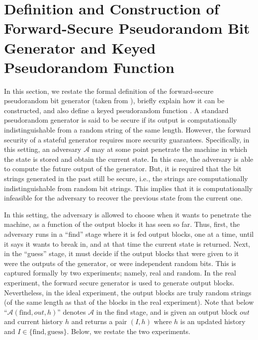 

\section{Definition and Construction of Forward-Secure Pseudorandom Bit Generator and Keyed Pseudorandom Function}\label{app:def-FS-PRG}

In this section, we restate the formal definition of the forward-secure pseudorandom bit generator (taken from \cite{BellareY03}), briefly explain how it can be constructed, and also define a keyed pseudorandom function \prf. A standard pseudorandom generator is said to be secure if its output is computationally indistinguishable from a random string of the same length. However, the forward security of a stateful generator requires more security guarantees. Specifically, in this setting,  an adversary $\mathcal{A}$ may at some point penetrate the machine in which the state is stored and obtain the current state. In this case, the adversary is able to compute the future output of the generator. But, it is required that the bit strings generated in the past still be secure, i.e., the strings are computationally indistinguishable from random bit strings. This implies that it is computationally infeasible for the adversary to recover the previous state from the current one. 





In this setting, the adversary is allowed to choose when it wants to penetrate the machine, as a function of the output blocks it has seen so far. Thus, first, the adversary runs in a ``find'' stage where it is fed output blocks, one at a time, until it says it wants to break in, and at that time the current state is returned.  Next, in the ``guess'' stage, it must decide if the output blocks that were given to it were the outputs of the generator, or were independent random bits. This is captured formally by two experiments; namely, real and random. In the real experiment, the forward secure generator is used to generate output blocks. Nevertheless, in the ideal experiment, the output blocks are truly random strings (of the same length as that of the blocks in the real experiment). Note that below ``$\mathcal{A}(\text{find}, out, h)$'' denotes $\mathcal{A}$ in the find stage, and is given an output block $out$ and current history $h$ and returns a pair $(I, h)$ where $h$ is an updated history and $I \in\{\text{find}, \text{guess}\}$. Below, we restate the two experiments. 






